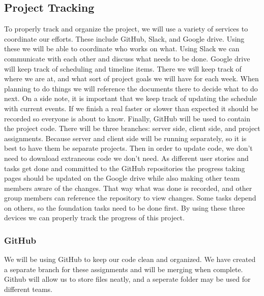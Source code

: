 \documentclass[12pt]{article}
\begin{document}
\subsection{Project Tracking}

To properly track and organize the project, we will use a variety of services to
coordinate our efforts. These include GitHub, Slack, and Google drive. Using
these we will be able to coordinate who works on what.\newline\newline
Using Slack we can
communicate with each other and discuss what needs to be done.\newline\newline
Google drive
will keep track of scheduling and timeline items. There we will keep track of
where we are at, and what sort of project goals we will have for each week. When
planning to do things we will reference the documents there to decide what to do
next. On a side note, it is important that we keep track of updating the
schedule with current events. If we finish a real faster or slower than expected
it should be recorded so everyone is about to know.\newline\newline
Finally, GitHub will be used
to contain the project code. There will be three branches: server side, client
side, and project assignments. Because server and client side will be running
separately, so it is best to have them be separate projects. Then in order to
update code, we don't need to download extraneous code we don't need.\newline\newline
As
different user stories and tasks get done and committed to the GitHub
repositories the progress taking pages should be updated on the Google drive
while also making other team members aware of the changes. That way what was
done is recorded, and other group members can reference the repository to view
changes. Some tasks depend on others, so the foundation tasks need to be done
first. By using these three devices we can properly track the progress of this
project.\newline

\subsubsection{GitHub}
	We will be using GitHub to keep our code clean and organized. We have created a separate branch for these assignments and will be merging when complete. Github will allow us to store files neatly, and a seperate folder may be used for different teams.
\end{document}
